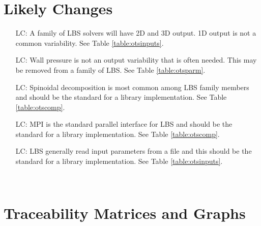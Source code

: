 \documentclass[12pt]{article}
\newcounter{lcnum} %
\begin{document}
\section{Likely Changes}    

\noindent \begin{itemize}

\item[LC\refstepcounter{lcnum}\thelcnum\label{LC_output}:] 
A family of LBS solvers will have 2D and 3D output. 1D output is not a common variability. See Table \ref{table:otsinputs}.
\item[LC\refstepcounter{lcnum}\thelcnum\label{LC_wallpressure}:] 
Wall pressure is not an output variability that is often needed. This may be removed from a family of LBS. See Table \ref{table:otsparm}.
\item[LC\refstepcounter{lcnum}\thelcnum\label{LC_decomposiiton}:] 
Spinoidal decomposition is most common among LBS family members and should be the standard for a library implementation. See Table \ref{table:otscomp}.
\item[LC\refstepcounter{lcnum}\thelcnum\label{LC_parallel}:] 
MPI is the standard parallel interface for LBS and should be the standard for a library implementation. See Table \ref{table:otscomp}.
\item[LC\refstepcounter{lcnum}\thelcnum\label{LC_input}:] 
LBS generally read input parameters from a file and this should be the standard for a library implementation. See Table \ref{table:otsinputs}.

\end{itemize}

~\newpage

\section{Traceability Matrices and Graphs}
\end{document}
